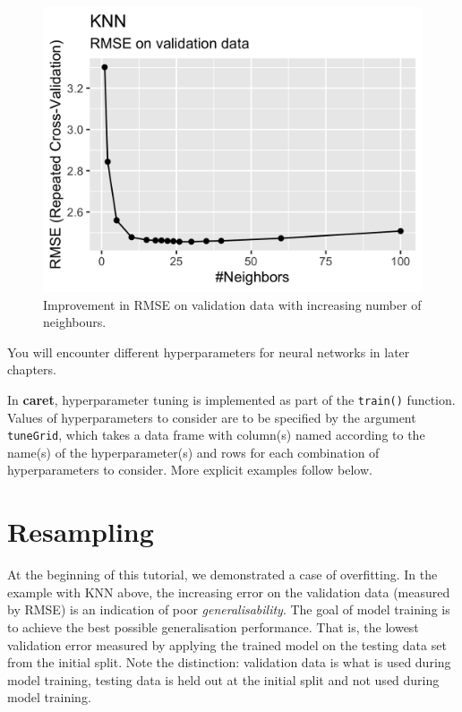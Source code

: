 \documentclass[
]{book}
\begin{document}
\begin{figure}
\includegraphics[width=16.67in]{fig/knn_hyperparameter_tuning} \caption{Improvement in RMSE on validation data with increasing number of neighbours.}\label{fig:hyper}
\end{figure}

You will encounter different hyperparameters for neural networks in later chapters.

In \textbf{caret}, hyperparameter tuning is implemented as part of the \texttt{train()} function. Values of hyperparameters to consider are to be specified by the argument \texttt{tuneGrid}, which takes a data frame with column(s) named according to the name(s) of the hyperparameter(s) and rows for each combination of hyperparameters to consider. More explicit examples follow below.

\hypertarget{resampling}{%
\section{Resampling}\label{resampling}}

At the beginning of this tutorial, we demonstrated a case of overfitting. In the example with KNN above, the increasing error on the validation data (measured by RMSE) is an indication of poor \emph{generalisability}. The goal of model training is to achieve the best possible generalisation performance. That is, the lowest validation error measured by applying the trained model on the testing data set from the initial split. Note the distinction: validation data is what is used during model training, testing data is held out at the initial split and not used during model training.
\end{document}
